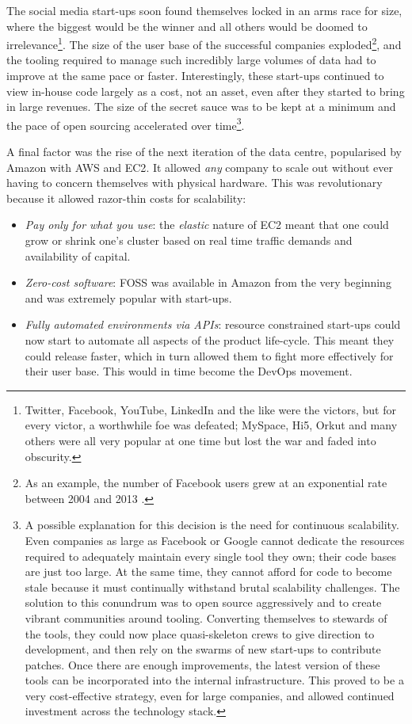 \documentclass{book}
\begin{document}
The social media start-ups soon found themselves locked in an arms
race for size, where the biggest would be the winner and all others
would be doomed to irrelevance\footnote{Twitter, Facebook, YouTube,
  LinkedIn and the like were the victors, but for every victor, a
  worthwhile foe was defeated; MySpace, Hi5, Orkut and many others
  were all very popular at one time but lost the war and faded into
  obscurity.}. The size of the user base of the successful companies
exploded\footnote{As an example, the number of Facebook users grew at
  an exponential rate between 2004 and 2013 \cite{Sedghi01}.}, and the
tooling required to manage such incredibly large volumes of data had
to improve at the same pace or faster. Interestingly, these start-ups
continued to view in-house code largely as a cost, not an asset, even
after they started to bring in large revenues. The size of the secret
sauce was to be kept at a minimum and the pace of open sourcing
accelerated over time\footnote{A possible explanation for this
  decision is the need for continuous scalability. Even companies as
  large as Facebook or Google cannot dedicate the resources required
  to adequately maintain every single tool they own; their code bases
  are just too large. At the same time, they cannot afford for code to
  become stale because it must continually withstand brutal
  scalability challenges. The solution to this conundrum was to open
  source aggressively and to create vibrant communities around
  tooling. Converting themselves to stewards of the tools, they could
  now place quasi-skeleton crews to give direction to development, and
  then rely on the swarms of new start-ups to contribute patches. Once
  there are enough improvements, the latest version of these tools can
  be incorporated into the internal infrastructure. This proved to be
  a very cost-effective strategy, even for large companies, and
  allowed continued investment across the technology stack.}.

A final factor was the rise of the next iteration of the data centre,
popularised by Amazon with AWS and EC2\cite{Wikipedia04}. It allowed
\emph{any} company to scale out without ever having to concern
themselves with physical hardware. This was revolutionary because it
allowed razor-thin costs for scalability:

\begin{itemize}
\item \emph{Pay only for what you use}: the \emph{elastic} nature of EC2
  meant that one could grow or shrink one's cluster based on real time
  traffic demands and availability of capital.
\item \emph{Zero-cost software}: FOSS was available in Amazon from the
  very beginning and was extremely popular with start-ups.
\item \emph{Fully automated environments via APIs}: resource
  constrained start-ups could now start to automate all aspects of the
  product life-cycle. This meant they could release faster, which in
  turn allowed them to fight more effectively for their user
  base. This would in time become the DevOps
  movement\cite{Wikipedia05}.
\end{itemize}
\end{document}
